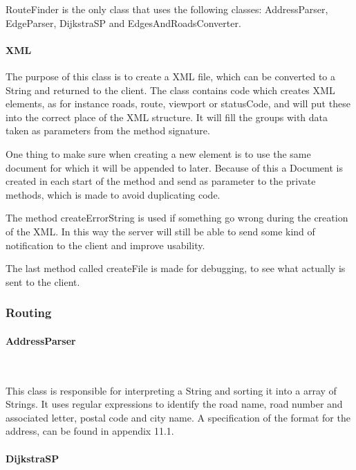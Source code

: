 \documentclass[a4paper,10pt,titlepage]{article}
\begin{document}
RouteFinder is the only class that uses the following classes: AddressParser,  EdgeParser, DijkstraSP and EdgesAndRoadsConverter.



				
				\paragraph{XML}\mbox{}
				
The purpose of this class is to create a XML file, which can be converted to a String and returned to the client. The class contains code which creates XML elements, as for instance roads, route, viewport or statusCode, and will put these into the correct place of the XML structure. It will fill the groups with data taken as parameters from the method signature. 

One thing to make sure when creating a new element is to use the same document for which it will be appended to later. Because of this a Document is created in each start of the method and send as parameter to the private methods, which is made to avoid duplicating code.

The method createErrorString is used if something go wrong during the creation of the XML. In this way the server will still be able to send some kind of notification to the client and improve usability.

The last method called createFile is made for debugging, to see what actually is sent to the client.

			\newpage
			\subsubsection{Routing}\mbox{}
				\paragraph{AddressParser}\mbox{}\

This class is responsible for interpreting a String and sorting it into a array of Strings. It uses regular expressions to identify the road name, road number and associated letter, postal code and city name. A specification of the format for the address, can be found in appendix 11.1.
				
				\paragraph{DijkstraSP \cite{sedgewickAndWayneDijkstraSP}}\mbox{}\
				
\end{document}
